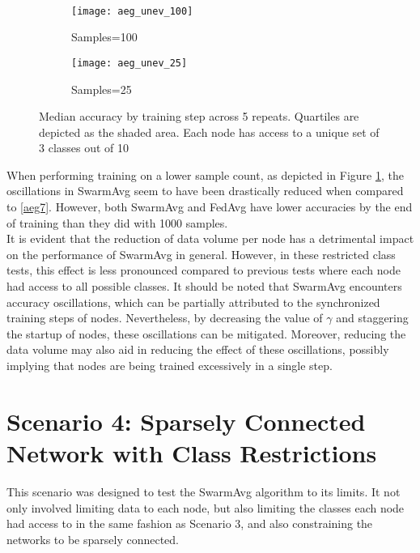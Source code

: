 \begin{figure}[H] 
	 \\
	\begin{subfigure}{0.49\textwidth}
		\texttt{[image: aeg\_unev\_100]}
		\caption{Samples=100}
	\end{subfigure}
	\begin{subfigure}{0.49\textwidth}
		\texttt{[image: aeg\_unev\_25]}
		\caption{Samples=25}
	\end{subfigure}
	\caption{Median accuracy by training step across 5 repeats. Quartiles are depicted as the shaded area. Each node has access to a unique set of 3 classes out of 10}
	\label{aeg8}
\end{figure}

When performing training on a lower sample count, as depicted in Figure \ref{aeg8}, the oscillations in SwarmAvg seem to have been drastically reduced when compared to \ref{aeg7}. However, both SwarmAvg and FedAvg have lower accuracies by the end of training than they did with 1000 samples. \\

It is evident that the reduction of data volume per node has a detrimental impact on the performance of SwarmAvg in general. However, in these restricted class tests, this effect is less pronounced compared to previous tests where each node had access to all possible classes. It should be noted that SwarmAvg encounters accuracy oscillations, which can be partially attributed to the synchronized training steps of nodes. Nevertheless, by decreasing the value of $\gamma$ and staggering the startup of nodes, these oscillations can be mitigated. Moreover, reducing the data volume may also aid in reducing the effect of these oscillations, possibly implying that nodes are being trained excessively in a single step.

\section{Scenario 4: Sparsely Connected Network with Class Restrictions}
This scenario was designed to test the SwarmAvg algorithm to its limits. It not only involved limiting data to each node, but also limiting the classes each node had access to in the same fashion as Scenario 3, and also constraining the networks to be sparsely connected.

